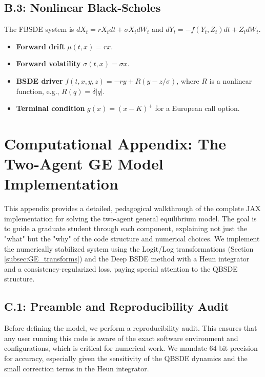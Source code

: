 \documentclass[11pt,letterpaper,oneside]{article}
\theoremstyle{plain}
\theoremstyle{definition}
\theoremstyle{remark}
\begin{document}
\subsection{B.3: Nonlinear Black-Scholes}
The FBSDE system is \(dX_t = rX_t dt + \sigma X_t dW_t\) and \(dY_t = -f(Y_t, Z_t)dt + Z_t dW_t\).
\begin{itemize}
    \item \textbf{Forward drift} \(\mu(t,x) = rx\).
    \item \textbf{Forward volatility} \(\sigma(t,x) = \sigma x\).
    \item \textbf{BSDE driver} \(f(t,x,y,z) = -ry + R(y - z/\sigma)\), where \(R\) is a nonlinear function, e.g., \(R(q) = \delta |q|\).
    \item \textbf{Terminal condition} \(g(x) = (x-K)^+\) for a European call option.
\end{itemize}

\section{Computational Appendix: The Two-Agent GE Model Implementation}
\label{app:GE_impl}

This appendix provides a detailed, pedagogical walkthrough of the complete JAX implementation for solving the two-agent general equilibrium model. The goal is to guide a graduate student through each component, explaining not just the "what" but the "why" of the code structure and numerical choices. We implement the numerically stabilized system using the Logit/Log transformations (Section \ref{subsec:GE_transforms}) and the Deep BSDE method with a Heun integrator and a consistency-regularized loss, paying special attention to the QBSDE structure.

\subsection{C.1: Preamble and Reproducibility Audit}
Before defining the model, we perform a reproducibility audit. This ensures that any user running this code is aware of the exact software environment and configurations, which is critical for numerical work. We mandate 64-bit precision for accuracy, especially given the sensitivity of the QBSDE dynamics and the small correction terms in the Heun integrator.
\end{document}
